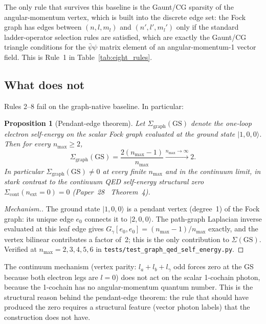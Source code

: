 \documentclass[11pt]{article}
\newtheorem{proposition}{Proposition}
\begin{document}
The only rule that survives this baseline is the Gaunt/CG sparsity of
the angular-momentum vertex, which is built into the discrete edge
set: the Fock graph has edges between $(n, l, m_l)$ and
$(n', l', m_l')$ only if the standard ladder-operator selection rules
are satisfied, which are exactly the Gaunt/CG triangle conditions for
the $\bar{\psi} \psi$ matrix element of an angular-momentum-1 vector
field.  This is Rule~1 in Table~\ref{tab:eight_rules}.

\subsection{What does not}

Rules 2--8 fail on the graph-native baseline.  In particular:

\begin{proposition}[Pendant-edge theorem]
\label{prop:pendant_edge}
Let $\Sigma_{\mathrm{graph}}(\mathrm{GS})$ denote the one-loop electron
self-energy on the scalar Fock graph evaluated at the ground state
$|1, 0, 0\rangle$.  Then for every $n_{\max} \ge 2$,
\[
   \Sigma_{\mathrm{graph}}(\mathrm{GS}) = \frac{2(n_{\max} - 1)}{n_{\max}}
   \xrightarrow{n_{\max} \to \infty} 2.
\]
In particular $\Sigma_{\mathrm{graph}}(\mathrm{GS}) \ne 0$ at every
finite $n_{\max}$ and in the continuum limit, in stark contrast to the
continuum QED self-energy structural zero
$\Sigma_{\mathrm{cont}}(n_{\mathrm{ext}} = 0) = 0$
(Paper~28~\cite{paper28} Theorem~4).
\end{proposition}

\begin{proof}[Mechanism.]
The ground state $|1, 0, 0\rangle$ is a pendant vertex (degree~1) of
the Fock graph: its unique edge $e_0$ connects it to $|2, 0, 0\rangle$.
The path-graph Laplacian inverse evaluated at this leaf edge gives
$G_\gamma[e_0, e_0] = (n_{\max} - 1)/n_{\max}$ exactly, and the vertex
bilinear contributes a factor of~2; this is the only contribution to
$\Sigma(\mathrm{GS})$.  Verified at $n_{\max} = 2, 3, 4, 5, 6$ in
\texttt{tests/test\_graph\_qed\_self\_energy.py}.
\end{proof}

The continuum mechanism (vertex parity: $l_a + l_b + l_\gamma$ odd
forces zero at the GS because both electron legs are $l = 0$) does
not act on the scalar 1-cochain photon, because the 1-cochain has no
angular-momentum quantum number.  This is the structural reason
behind the pendant-edge theorem: the rule that should have produced
the zero requires a structural feature (vector photon labels) that
the construction does not have.
\end{document}

